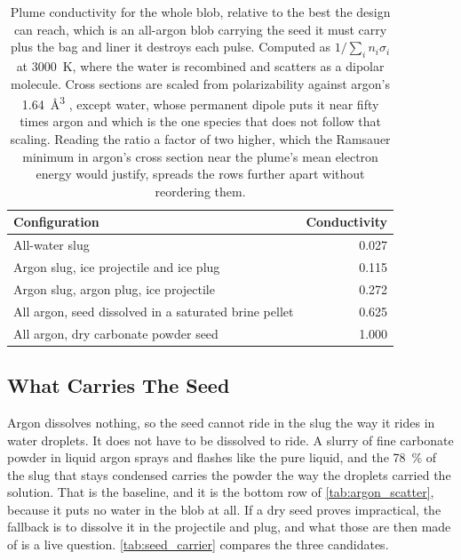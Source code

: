 \documentclass{article}
\begin{document}
\begin{table}[!htpb]
    \centering
    \caption{Plume conductivity for the whole blob, relative to the best the design can reach, which is an all-argon blob carrying the seed it must carry plus the bag and liner it destroys each pulse. Computed as $1/\sum_i n_i \sigma_i$ at \SI{3000}{\kelvin}, where the water is recombined and scatters as a dipolar molecule. Cross sections are scaled from polarizability against argon's \SI{1.64}{\cubic\angstrom} \cite{crc_handbook}, except water, whose permanent dipole puts it near fifty times argon and which is the one species that does not follow that scaling. Reading the ratio a factor of two higher, which the Ramsauer minimum in argon's cross section near the plume's mean electron energy would justify, spreads the rows further apart without reordering them.}
    \label{tab:argon_scatter}
    \begin{tabular}{|l|r|}\hline
        \textbf{Configuration} & \textbf{Conductivity} \\\hline
        All-water slug & \num{0.027} \\\hline
        Argon slug, ice projectile and ice plug & \num{0.115} \\\hline
        Argon slug, argon plug, ice projectile & \num{0.272} \\\hline
        All argon, seed dissolved in a saturated brine pellet & \num{0.625} \\\hline
        All argon, dry carbonate powder seed & \num{1.000} \\\hline
    \end{tabular}
\end{table}

\subsection*{What Carries The Seed}
Argon dissolves nothing, so the seed cannot ride in the slug the way it rides in water droplets. It does not have to be dissolved to ride. A slurry of fine carbonate powder in liquid argon sprays and flashes like the pure liquid, and the \SI{78}{\percent} of the slug that stays condensed carries the powder the way the droplets carried the solution. That is the baseline, and it is the bottom row of \autoref{tab:argon_scatter}, because it puts no water in the blob at all. If a dry seed proves impractical, the fallback is to dissolve it in the projectile and plug, and what those are then made of is a live question. \autoref{tab:seed_carrier} compares the three candidates.
\end{document}
